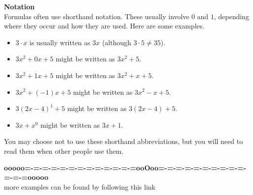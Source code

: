 \documentclass{ximera}
\begin{document}
\begin{warning} \textbf{\textcolor{red!90!darkgray}{Notation}}  \\


Formulas often use shorthand notation.  These usually involve $0$ and $1$, depending where they occur and how they are used.  Here are some examples.


\begin{itemize}
\item $3 \cdot x$ is usually written as $3x$ (although $3 \cdot 5 \ne 35$).
\item $3x^2 + 0 x + 5$  might be written as $3x^2 + 5$.
\item $3x^2 + 1 x + 5$  might be written as $3x^2 + x + 5$.
\item $3x^2 + (-1) x + 5$  might be written as $3x^2 - x + 5$.
\item $3(2x-4)^1 + 5$  might be written as $3(2x-4) + 5$.
\item $3x + x^0$  might be written as $3x + 1$.
\end{itemize}


You may choose not to use these shorthand abbreviations, but you will need to read them when other people use them.

\end{warning}

















\begin{center}
\textbf{\textcolor{green!50!black}{ooooo=-=-=-=-=-=-=-=-=-=-=-=-=ooOoo=-=-=-=-=-=-=-=-=-=-=-=-=ooooo}} \\

more examples can be found by following this link\\ 

\end{center}
\end{document}

